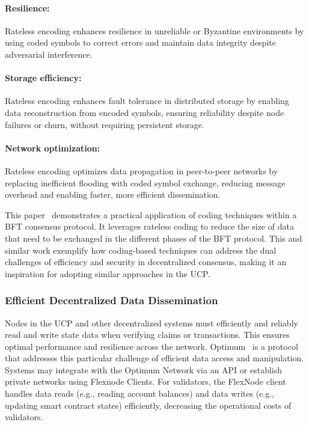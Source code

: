 \documentclass{article}
\newcommand{\UC}{UCP}
\begin{document}
\paragraph{Resilience:} 
Rateless encoding enhances resilience in unreliable or Byzantine environments by using coded symbols to correct errors and maintain data integrity despite adversarial interference.

\paragraph{Storage efficiency:} 
Rateless encoding enhances fault tolerance in distributed storage by enabling data reconstruction from encoded symbols, ensuring reliability despite node failures or churn, without requiring persistent storage.

\paragraph{Network optimization:}
Rateless encoding optimizes data propagation in peer-to-peer networks by replacing inefficient flooding with coded symbol exchange, reducing message overhead and enabling faster, more efficient dissemination.

This paper~\cite{ChoiCSHM:2019} demonstrates a practical application of coding techniques within a BFT consensus protocol. It leverages rateless coding to reduce the size of data that need to be exchanged in the different phases of the BFT protocol. This and similar work exemplify how coding-based techniques can address the dual challenges of efficiency and security in decentralized consensus, making it an inspiration for adopting similar approaches in the \UC{}.

\subsubsection{Efficient Decentralized Data Dissemination}

Nodes in the \UC{} and other decentralized systems must efficiently and reliably read and write state data when verifying claims or transactions. This ensures optimal performance and resilience across the network. Optimum~\cite{OptimumO:2024} is a protocol that addresses this particular challenge of efficient data access and manipulation. Systems may integrate with the Optimum Network via an API or establish private networks using Flexnode Clients. For validators, the FlexNode client handles data reads (e.g., reading account balances) and data writes (e.g., updating smart contract states) efficiently, decreasing the operational costs of validators.
\end{document}
